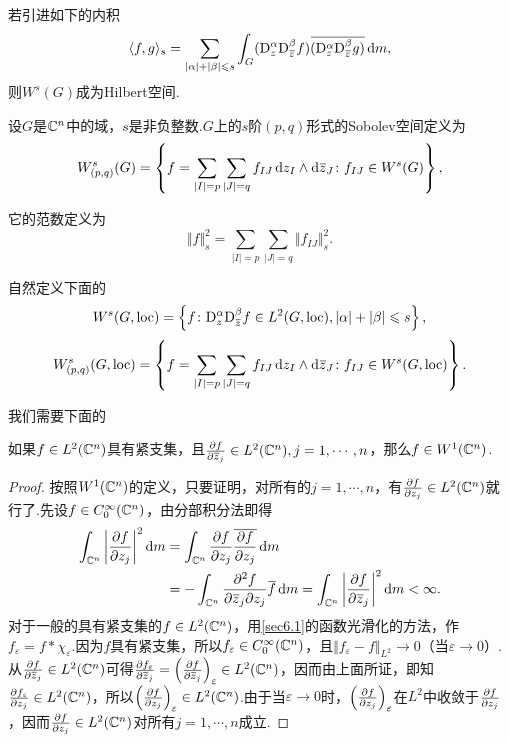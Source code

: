 若引进如下的内积
\[\langle f,g\rangle_s=\sum_{|\alpha|+|\beta|\le s}\int_G(\DD_z^\alpha\DD_{\bar{z}}^\beta f)\bar{(\DD_z^\alpha\DD_{\bar{z}}^\beta g)}\dif m,\]
则$W^s(G)$成为Hilbert空间.
\begin{definition}\label{def6.4.2}
	设$G$是$\MC^n$中的域，$s$是非负整数.$G$上的$s$阶$(p,q)$形式的Sobolev空间定义为
	\[W_{(p,q)}^s(G)=\left\{f=\sum_{|I|=p}\sum_{|J|=q}f_{IJ}\dz_I\wedge\dzz_J\colon f_{IJ}\in W^s(G)\right\},\]
	
	它的范数定义为
	\[\Vert f\Vert_s^2=\sum_{|I|=p}\sum_{|J|=q}\Vert f_{IJ}\Vert_s^2.\]
	
	自然定义下面的
	\[W^s(G,\loc)=\left\{f\colon \DD_z^\alpha\DD_{\bar{z}}^\beta f\in L^2(G,\loc),|\alpha|+|\beta|\le s\right\},\]
	\[W_{(p,q)}^s(G,\loc)=\left\{f=\sum_{|I|=p}\sum_{|J|=q}f_{IJ}\dz_I\wedge\dzz_J\colon f_{IJ}\in W^s(G,\loc)\right\}.\]
\end{definition}
我们需要下面的
\begin{prop}\label{prop6.4.3}
	如果$f\in L^2(\MC^n)$具有紧支集，且$\pp{f}{\bar{z}_j}\in L^2(\MC^n),j=1,\cdots,n$，那么$f\in W^1(\MC^n)$.
\end{prop}
\begin{proof}
	按照$W^1(\MC^n)$的定义，只要证明，对所有的$j=1,\cdots,n$，有$\pp{f}{z_j}\in L^2(\MC^n)$就行了.先设$f\in C_0^\infty(\MC^n)$，由分部积分法即得
	\begin{align*}
		\int_{\MC^n}\left|\pp{f}{z_j}\right|^2\dif m
		&=\int_{\MC^n}\pp{f}{z_j}\bar{\pp{f}{z_j}}\dif m\\
		&=-\int_{\MC^n}\pppp{f}{\bar{z}_j}{z_j}\bar{f}\dif m=\int_{\MC^n}\left|\pp{f}{\bar{z}_j}\right|^2\dif m<\infty.
	\end{align*}
	对于一般的具有紧支集的$f\in L^2(\MC^n)$，用\ref{sec6.1}的函数光滑化的方法，作$f_\varepsilon=f\ast\chi_\varepsilon$.因为$f$具有紧支集，所以$f_\varepsilon\in C_0^\infty(\MC^n)$，且$\Vert f_\varepsilon-f\Vert_{L^2}\to0$（当$\varepsilon \to0$）.从$\pp{f}{\bar{z}_j}\in L^2(\MC^n)$可得$\pp{f_\varepsilon}{\bar{z}_j}=\left(\pp{f}{\bar{z}_j}\right)_\varepsilon\in L^2(\MC^n)$，因而由上面所证，即知$\pp{f_\varepsilon}{z_j}\in L^2(\MC^n)$，所以$\left(\pp{f}{z_j}\right)_\varepsilon\in L^2(\MC^n)$.由于当$\varepsilon\to0$时，$\left(\pp{f}{z_j}\right)_\varepsilon$在$L^2$中收敛于$\pp{f}{z_j}$，因而$\pp{f}{z_j}\in L^2(\MC^n)$对所有$j=1,\cdots,n$成立.
\end{proof}
